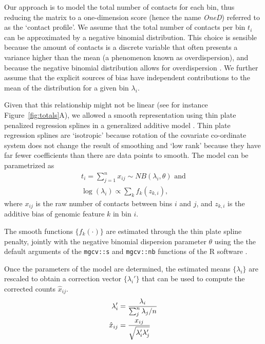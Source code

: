 \documentclass[a4,center,fleqn]{NAR}
\begin{document}
Our approach is to model the total number of contacts for each bin, thus
reducing the matrix to a one-dimension score (hence the name
\textit{OneD}) referred to as the `contact profile'. We assume that the
total number of contacts per bin $t_{i}$ can be approximated by a
negative binomial distribution. This choice is sensible because the amount
of contacts is a discrete variable that often presents a variance higher
than the mean \citep{carty2017integrated} (a phenomenon known as
overdispersion), and because the negative binomial distribution allows
for overdispersion \citep{love2014moderated}. We further assume that
the explicit sources of bias have independent contributions to the mean
of the distribution for a given bin $\lambda_i$.

Given that this relationship might not be linear (see for instance
Figure~\ref{fig:totals}A), we allowed a smooth representation using thin
plate penalized regression splines \citep{wood2003thin} in a generalized
additive model \citep{wood2011fast}. Thin plate regression splines are
`isotropic' because rotation of the covariate co-ordinate system does not
change the result of smoothing and `low rank' because they have far fewer
coefficients than there are data points to smooth. The model can be
parametrized as
\begin{gather*}
t_i = \sum_{j=1}^n{x_{ij}} \sim  NB(\lambda_i, \theta) \text{ and} \\
\log(\lambda_i) \propto \sum_{k}{f_k(z_{k,i})},
\end{gather*}
where $x_{ij}$ is the raw number of contacts between bins $i$ and $j$, and
$z_{k,i}$ is the additive bias of genomic feature $k$ in bin $i$.

The smooth functions $\{f_k(\cdot)\}$ are estimated through the thin plate
spline penalty, jointly with the negative binomial dispersion parameter
$\theta$ using the the default arguments of the \texttt{mgcv::s} and
\texttt{mgcv::nb} functions \citep{wood2011fast} of the R software
\citep{coreteam2014r}.


Once the parameters of the model are determined, the estimated means
$\{\lambda_i\}$ are rescaled to obtain a correction vector
$\{\lambda_i'\}$ that can be used to compute the corrected counts
$\hat{x}_{ij}$.
\begin{align}
\notag
\lambda_i' &= \frac{\lambda_i}{\sum_j^n{\lambda_j}/n} \\
\label{eq:xhat}
\hat{x}_{ij} &= \frac{x_{ij}}{\sqrt{\lambda_i'\lambda_j'}}
\end{align}
\end{document}
